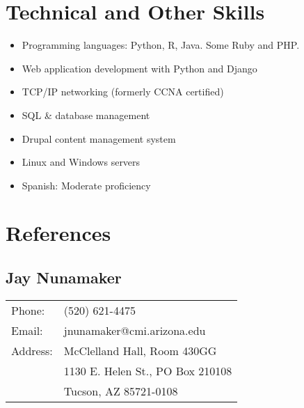 \documentclass[10pt, a4paper]{article}
\begin{document}

\section*{Technical and Other Skills}

\begin{itemize}
\itemsep0em
\item Programming languages: Python, R, Java. Some Ruby and PHP.
\item Web application development with Python and Django
\item TCP/IP networking (formerly CCNA certified)
\item SQL \& database management
\item Drupal content management system
\item Linux and Windows servers
\item Spanish: Moderate proficiency
\end{itemize}

\section*{References}

\subsection*{Jay Nunamaker} 

\begin{tabular}{ll}
  Phone: & (520) 621-4475 \\
  Email: & jnunamaker@cmi.arizona.edu\\
  Address: & McClelland Hall, Room 430GG\\
  & 1130 E. Helen St., PO Box 210108\\
  & Tucson, AZ 85721-0108
\end{tabular}
\end{document}
